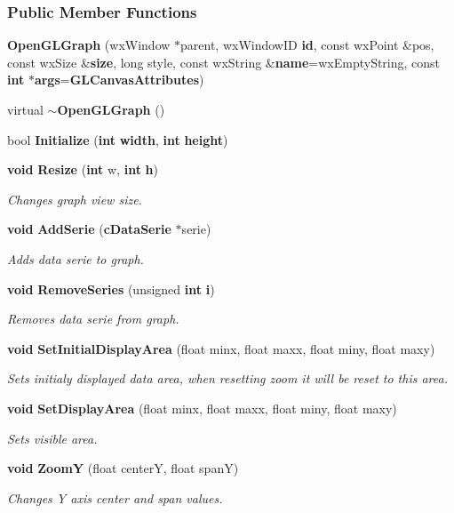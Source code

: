 \subsubsection*{Public Member Functions}
\begin{DoxyCompactItemize}
\item 
{\bf Open\+G\+L\+Graph} (wx\+Window $\ast$parent, wx\+Window\+ID {\bf id}, const wx\+Point \&pos, const wx\+Size \&{\bf size}, long style, const wx\+String \&{\bf name}=wx\+Empty\+String, const {\bf int} $\ast${\bf args}={\bf G\+L\+Canvas\+Attributes})
\item 
virtual {\bf $\sim$\+Open\+G\+L\+Graph} ()
\item 
bool {\bf Initialize} ({\bf int} {\bf width}, {\bf int} {\bf height})
\item 
{\bf void} {\bf Resize} ({\bf int} w, {\bf int} {\bf h})
\begin{DoxyCompactList}\small\item\em Changes graph view size. \end{DoxyCompactList}\item 
{\bf void} {\bf Add\+Serie} ({\bf c\+Data\+Serie} $\ast$serie)
\begin{DoxyCompactList}\small\item\em Adds data serie to graph. \end{DoxyCompactList}\item 
{\bf void} {\bf Remove\+Series} (unsigned {\bf int} {\bf i})
\begin{DoxyCompactList}\small\item\em Removes data serie from graph. \end{DoxyCompactList}\item 
{\bf void} {\bf Set\+Initial\+Display\+Area} (float minx, float maxx, float miny, float maxy)
\begin{DoxyCompactList}\small\item\em Sets initialy displayed data area, when resetting zoom it will be reset to this area. \end{DoxyCompactList}\item 
{\bf void} {\bf Set\+Display\+Area} (float minx, float maxx, float miny, float maxy)
\begin{DoxyCompactList}\small\item\em Sets visible area. \end{DoxyCompactList}\item 
{\bf void} {\bf ZoomY} (float centerY, float spanY)
\begin{DoxyCompactList}\small\item\em Changes Y axis center and span values. \end{DoxyCompactList}\item 

\end{DoxyCompactItemize}
